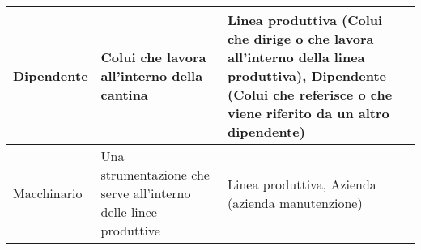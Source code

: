 \begin{center}
\begin{tabular}{P{2cm}P{8cm}P{4cm}}
		\midrule
		Dipendente & Colui che lavora all'interno della cantina &  Linea produttiva (Colui che dirige o che lavora all'interno della linea produttiva), Dipendente (Colui che referisce o che viene riferito da un altro dipendente)\\
		\midrule
		Macchinario & Una strumentazione che serve all'interno delle linee produttive &  Linea produttiva, Azienda (azienda manutenzione)\\
		
		\bottomrule
	\end{tabular}
\end{center}